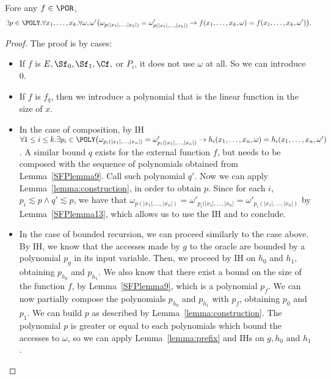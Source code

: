 \begin{lemma}[Prefix]\label{lemma:prefix}
Fore any $f\in \POR$,
\footnotesize
$$
\exists p \in \POLY. \forall x_1,\dots, x_k.
\forall \omega, \omega'\big(
\omega_{p(|x_1|,\dots, |x_k|)}=
\omega'_{p(|x_1|,\dots, |x_k|)}
\rightarrow f(x_1,\dots, x_k,\omega)
=f(x_1,\dots, x_k,\omega')\big).
$$
\end{lemma}
\begin{proof}
{The proof is by cases}:
\begin{itemize}
\item If $f$ is $E,\Sf_0,\Sf_1,\Cf,$ or {$P_i$},
it does not use $\omega$ at all. So we can introduce
{0}.
%
\item If $f$ is $f_q$, then we introduce
a polynomial that is the linear function
in the size of $x$.
%
\item In the case of composition, by IH $\forall 1\leq i\leq k.
\exists p_i\in \POLY\big(\omega_{p_i(|x_1|,\dots,|x_n|)}=
\omega'_{p_{i}(|x_1|,\dots, |x_n|)}\rightarrow
h_i(x_1,\dots, x_n,\omega)=h_i(x_1,\dots, x_n,\omega')$.
A similar bound $q$ exists for the external function $f$,
but needs to be composed with the sequence
of polynomials obtained from Lemma~\ref{SFPlemma9}.
Call such polynomial $q'$.
Now we can apply Lemma~\ref{lemma:construction},
in order to obtain $p$.
Since for each $i$, $p_i\lesssim p \wedge
q'\lesssim  p$,
we have that
$\omega_{p(|x_1|,\dots,|x_n|)}=
\omega'_{p_i(|x_1|,\dots, |x_n|}
= \omega'_{p_i(|x_1|,\dots, |x_n|)}$
by Lemma~\ref{SFPlemma13},
which allows us to use the IH
and to conclude.
%
\item In the case of bounded recursion, we can
proceed similarly to the case above.
By IH, we know that the accesses made by $g$
to the oracle are bounded by a polynomial
$p_g$ in its input variable.
Then, we proceed by IH on $h_0$ and $h_1$,
obtaining $p_{h_0}$ and $p_{h_1}$.
We also know that there exist a bound on the
size of the function $f$, by Lemma~\ref{SFPlemma9},
which is a polynomial $p_f$.
We can now partially compose the polynomials
$p_{h_0}$ and $p_{h_1}$ with
$p_f$, obtaining $p_0$ and $p_1$.
We can build $p$ as described by Lemma~\ref{lemma:construction}.
The polynomial $p$ is greater or equal to each
polynomials which bound the accesses
to $\omega$, so we can apply Lemma~\ref{lemma:prefix}
and IHs on $g,h_0$ and $h_1$.
\end{itemize}
\end{proof}







